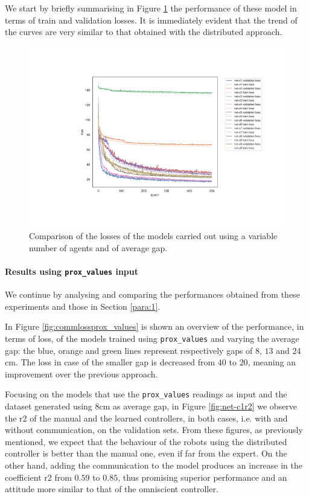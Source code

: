 We start by briefly summarising in Figure \ref{fig:commlossallt} the performance 
of these model in terms of train and validation losses. It is immediately evident 
that the trend of the curves are very similar to that obtained with the distributed 
approach. 
\begin{figure}[!htb]
	\centering
	\includegraphics[width=.8\textwidth]{contents/images/task1-comm/loss-communication-all@}%
	\caption[Comparison of losses of the second set of experiments.]{Comparison 
	of the losses of the models carried out using a variable number of agents and of 
	average gap.}
	\label{fig:commlossallt}
	\vspace{-0.5cm}
\end{figure}

\paragraph*{Results using \texttt{prox\_values} input}
We continue by analysing and comparing the performances obtained from these 
experiments and those in Section \ref{para:1}.

In Figure \ref{fig:commlossprox_values} is shown an overview of the performance, 
in terms of loss, of the models trained using \texttt{prox\_values} and varying the 
average gap: the blue, orange and green lines represent respectively gaps of $8$, 
$13$ and $24$\gls{cm}.
The loss in case of the smaller gap is decreased from $40$ to $20$, meaning an 
improvement over the previous approach.

Focusing on the models that use the \texttt{prox\_values} readings as input and 
the dataset generated using $8$\gls{cm} as average gap, in Figure 
\ref{fig:net-c1r2} we observe the \gls{r2} of the manual and the learned 
controllers, in both cases, i.e. with and without communication, on the validation 
sets.
From these figures, as previously mentioned, we expect that the behaviour of the 
robots using the distributed controller is better than the manual one, even if 
far from the expert. On the other hand, adding the communication to the model 
produces an increase in the coefficient \gls{r2} from $0.59$ to $0.85$, thus 
promising superior performance and an attitude more similar to that of the 
omniscient controller.

